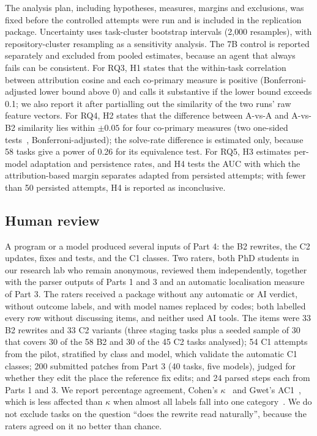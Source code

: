 \documentclass[conference]{IEEEtran}
\begin{document}
The analysis plan, including hypotheses, measures, margins and exclusions, was fixed before the controlled attempts were run and is included in the replication package. Uncertainty uses task-cluster bootstrap intervals (2{,}000 resamples), with repository-cluster resampling as a sensitivity analysis. The 7B control is reported separately and excluded from pooled estimates, because an agent that always fails can be consistent. For RQ3, H1 states that the within-task correlation between attribution cosine and each co-primary measure is positive (Bonferroni-adjusted lower bound above 0) and calls it substantive if the lower bound exceeds 0.1; we also report it after partialling out the similarity of the two runs' raw feature vectors. For RQ4, H2 states that the difference between A-vs-A and A-vs-B2 similarity lies within $\pm0.05$ for four co-primary measures (two one-sided tests~\cite{schuirmann1987tost,lakens2018equivalence}, Bonferroni-adjusted); the solve-rate difference is estimated only, because 58 tasks give a power of 0.26 for its equivalence test. For RQ5, H3 estimates per-model adaptation and persistence rates, and H4 tests the AUC with which the attribution-based margin separates adapted from persisted attempts; with fewer than 50 persisted attempts, H4 is reported as inconclusive.

\subsection{Human review}
\label{sec:humandesign}
A program or a model produced several inputs of Part 4: the B2 rewrites, the C2 updates, fixes and tests, and the C1 classes. Two raters, both PhD students in our research lab who remain anonymous, reviewed them independently, together with the parser outputs of Parts 1 and 3 and an automatic localisation measure of Part 3. The raters received a package without any automatic or AI verdict, without outcome labels, and with model names replaced by codes; both labelled every row without discussing items, and neither used AI tools. The items were 33 B2 rewrites and 33 C2 variants (three staging tasks plus a seeded sample of 30 that covers 30 of the 58 B2 and 30 of the 45 C2 tasks analysed); 54 C1 attempts from the pilot, stratified by class and model, which validate the automatic C1 classes; 200 submitted patches from Part 3 (40 tasks, five models), judged for whether they edit the place the reference fix edits; and 24 parsed steps each from Parts 1 and 3. We report percentage agreement, Cohen's $\kappa$~\cite{cohen1960kappa} and Gwet's AC1~\cite{gwet2008ac1}, which is less affected than $\kappa$ when almost all labels fall into one category~\cite{feinstein1990paradox}. We do not exclude tasks on the question ``does the rewrite read naturally'', because the raters agreed on it no better than chance.
\end{document}
